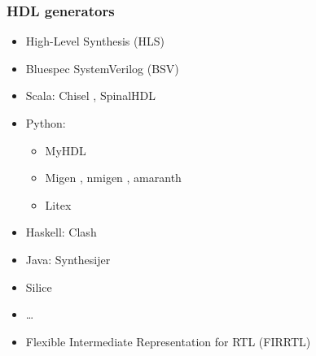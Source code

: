 \documentclass{beamer}
\begin{document}
\begin{frame}
\frametitle{HDL generators}
\begin{itemize}
\item High-Level Synthesis (HLS)
\href{https://en.wikipedia.org/wiki/High-level_synthesis}{\faWikipediaW}

\item Bluespec SystemVerilog (BSV) \href{https://bluespec.com/}{\faGlobe}
\href{https://github.com/bluespec}{\faGithub} \href{https://github.com/B-Lang-org/bsc}{\faGit}

\item Scala:
Chisel
\href{https://www.chisel-lang.org/}{\faGlobe} \href{https://github.com/freechipsproject/chisel3}{\faGithub},
SpinalHDL
\href{https://github.com/SpinalHDL}{\faGithub} \href{https://spinalhdl.github.io/SpinalDoc-RTD/}{\faBook}

\item Python:
\begin{itemize}
  \item
MyHDL
\href{http://www.myhdl.org/}{\faGlobe} \href{https://github.com/myhdl/myhdl}{\faGithub}
  \item
Migen
\href{https://m-labs.hk/gateware/migen/}{\faGlobe}
\href{https://github.com/m-labs?type=source}{\faGithub},
nmigen
\href{https://m-labs.hk/gateware/nmigen/}{\faGlobe}
\href{https://gitlab.com/nmigen}{\faGitlab},
amaranth
\href{https://amaranth-lang.org/}{\faGlobe}
\href{https://github.com/amaranth-lang}{\faGithub}
  \item
Litex
\href{https://github.com/enjoy-digital/litex}{\faGithub}
\end{itemize}

\item Haskell:
Clash
\href{https://clash-lang.org/}{\faGlobe}
\href{https://github.com/clash-lang}{\faGithub}

\item Java:
Synthesijer
\href{https://github.com/synthesijer/synthesijer}{\faGithub}
\href{https://synthesijer.github.io/web/}{\faBook}

\item
Silice
\href{https://github.com/sylefeb/Silice}{\faGithub}

\item \ldots
\end{itemize}

\vfill

\begin{itemize}
\item Flexible Intermediate Representation for RTL (FIRRTL)
\href{https://github.com/freechipsproject/firrtl}{\faGithub}
\href{https://freechipsproject.github.io/firrtl/}{\faBook}
\end{itemize}
\end{frame}
\end{document}
